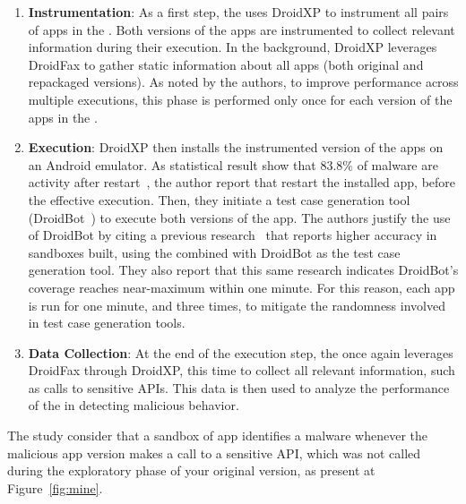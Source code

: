 \begin{enumerate}[1.]
 \item \textbf{Instrumentation}: As a first step, the \fhc uses DroidXP to instrument all pairs of apps in the \cds. Both versions of the apps are instrumented to collect relevant information during their execution. In the background, DroidXP leverages DroidFax to gather static information about all apps (both original and repackaged versions). As noted by the authors, to improve performance across multiple executions, this phase is performed only once for each version of the apps in the \cds.

   
\item \textbf{Execution}: DroidXP then installs the instrumented version of the apps on an Android emulator. As statistical result show that $83.8\%$ of malware are activity after restart~\cite{DBLP:conf/sp/ZhouJ12}, the author report that restart the installed app, before the effective execution. Then, they initiate a test case generation tool (DroidBot~\cite{DBLP:conf/icse/LiYGC17}) to execute both versions of the app. The authors justify the use of DroidBot by citing a previous research~\cite{DBLP:conf/wcre/BaoLL18} that reports higher accuracy in sandboxes built, using the \mas combined with DroidBot as the test case generation tool. They also report that this same research indicates DroidBot’s coverage reaches near-maximum within one minute. For this reason, each app is run for one minute, and three times, to mitigate the randomness involved in test case generation tools.

\item \textbf{Data Collection}: At the end of the execution step, the \fhc once again leverages DroidFax through DroidXP, this time to collect all relevant information, such as calls to sensitive APIs. This data is then used to analyze the performance of the \mas in detecting malicious behavior.
\end{enumerate}


The study consider that a sandbox of app identifies a malware whenever the malicious app version makes a call to a sensitive API, which was not called during the exploratory phase of your original version, as present at Figure~\ref{fig:mine}.


